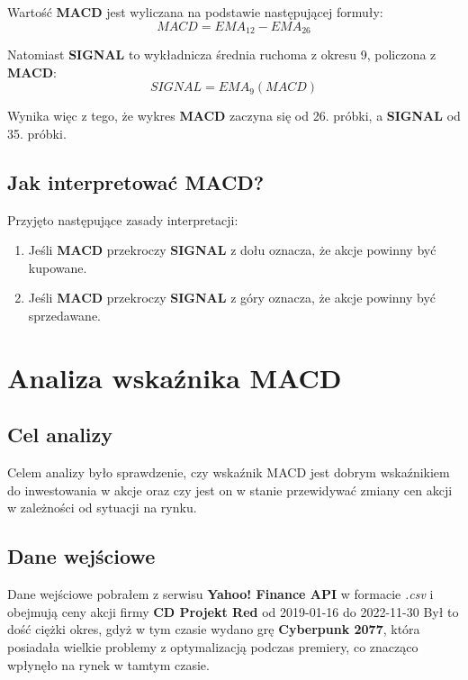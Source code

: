 \documentclass{article}
\begin{document}
    Wartość \textbf{MACD} jest wyliczana na podstawie następującej formuły:
    \begin{equation}
        MACD = EMA_{12} - EMA_{26}
    \end{equation}

    Natomiast \textbf{SIGNAL} to wykładnicza średnia ruchoma z okresu 9, policzona z \textbf{MACD}:
    \begin{equation}
        SIGNAL = EMA_{9}(MACD)
    \end{equation}

    Wynika więc z tego, że wykres \textbf{MACD} zaczyna się od 26. próbki, a \textbf{SIGNAL} od 35. próbki.

    \subsection{Jak interpretować MACD?}

    Przyjęto następujące zasady interpretacji:
    \begin{enumerate}
        \item Jeśli \textbf{MACD} przekroczy \textbf{SIGNAL} z dołu oznacza, że akcje powinny być kupowane.
        \item Jeśli \textbf{MACD} przekroczy \textbf{SIGNAL} z góry oznacza, że akcje powinny być sprzedawane.
    \end{enumerate}

    \section{Analiza wskaźnika MACD}
    \subsection{Cel analizy}

    Celem analizy było sprawdzenie, czy wskaźnik MACD jest dobrym wskaźnikiem do inwestowania w akcje
    oraz czy jest on w stanie przewidywać zmiany cen akcji w zależności od sytuacji na rynku.
    \subsection{Dane wejściowe}

    Dane wejściowe pobrałem z serwisu \textbf{Yahoo! Finance API} \cite{api} w formacie \textit{.csv} i obejmują
    ceny akcji firmy \textbf{CD Projekt Red} od 2019-01-16 do 2022-11-30
    Był to dość ciężki okres, gdyż w tym czasie wydano grę
    \textbf{Cyberpunk 2077}, która posiadała wielkie problemy z optymalizacją podczas premiery,
    co znacząco wpłynęło na rynek w tamtym czasie.
\end{document}
